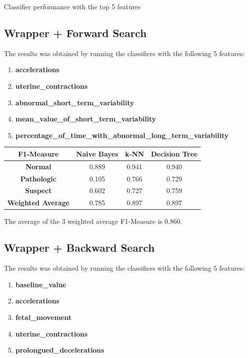 \documentclass[12pt]{article}
\begin{document}
\begin{section}{Classifier performance with the top 5 features}
 \subsection{Wrapper + Forward Search}
 The results was obtained by running the classifiers with the following 5 features:
 \begin{enumerate}
     \item \textbf{accelerations}
     \item \textbf{uterine\_contractions}
     \item \textbf{abnormal\_short\_term\_variability}
     \item \textbf{mean\_value\_of\_short\_term\_variability}
     \item \textbf{percentage\_of\_time\_with\_abnormal\_long\_term\_variability}
 \end{enumerate}

 \begin{center}
     \begin{tabular}{| c | c | c | c |}
         \hline
         \textbf{F1-Measure}       & \textbf{Naive Bayes} & \textbf{k-NN} & \textbf{Decision Tree} \\ [0.5ex]
         \hline
         \textbf{Normal}           & 0.889                & 0.941         & 0.940                  \\
         \hline
         \textbf{Pathologic}       & 0.105                & 0.766         & 0.729                  \\
         \hline
         \textbf{Suspect}          & 0.602                & 0.727         & 0.759                  \\
         \hline
         \hline
         \textbf{Weighted Average} & 0.785                & 0.897         & 0.897                  \\
         \hline
     \end{tabular}
 \end{center}

 The average of the 3 weighted average F1-Measure is $0.860$.

 \subsection{Wrapper + Backward Search}
 The results was obtained by running the classifiers with the following 5 features:
 \begin{enumerate}
     \item \textbf{baseline\_value}
     \item \textbf{accelerations}
     \item \textbf{fetal\_movement}
     \item \textbf{uterine\_contractions}
     \item \textbf{prolongued\_decelerations}
 \end{enumerate}


\end{section}
\end{document}
